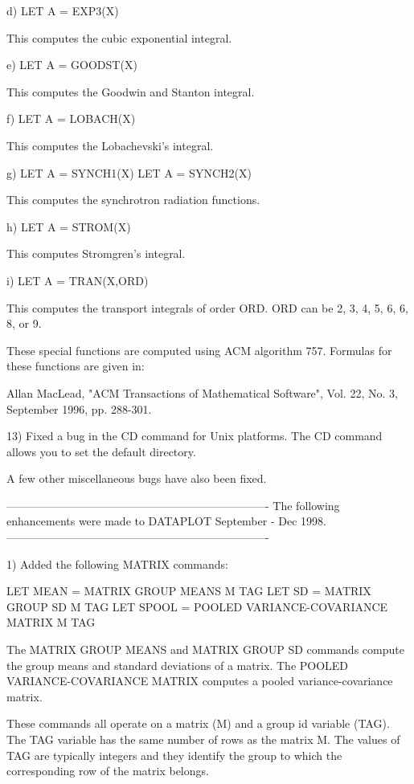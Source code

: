 {    d) LET A = EXP3(X)
 
       This computes the cubic exponential integral.

    e) LET A = GOODST(X)
 
       This computes the Goodwin and Stanton integral.

    f) LET A = LOBACH(X)
 
       This computes the Lobachevski's integral.

    g) LET A = SYNCH1(X)
       LET A = SYNCH2(X)
 
       This computes the synchrotron radiation functions.

    h) LET A = STROM(X)
 
       This computes Stromgren's integral.

    i) LET A = TRAN(X,ORD)
 
       This computes the transport integrals of order ORD.
       ORD can be 2, 3, 4, 5, 6, 6, 8, or 9.

    These special functions are computed using ACM algorithm 757.
    Formulas for these functions are given in:

        Allan MacLead, "ACM Transactions of Mathematical Software",
        Vol. 22, No. 3, September 1996, pp. 288-301.

13) Fixed a bug in the CD command for Unix platforms.  The CD command
    allows you to set the default directory.

    A few other miscellaneous bugs have also been fixed.

----------------------------------------------------------------------
The following enhancements were made to DATAPLOT September - Dec 1998.
----------------------------------------------------------------------

 1) Added the following MATRIX commands:

       LET MEAN = MATRIX GROUP MEANS M TAG
       LET SD   = MATRIX GROUP SD    M TAG
       LET SPOOL = POOLED VARIANCE-COVARIANCE MATRIX M TAG

    The MATRIX GROUP MEANS and MATRIX GROUP SD commands compute
    the group means and standard deviations of a matrix.
    The POOLED VARIANCE-COVARIANCE MATRIX computes a pooled
    variance-covariance matrix.

    These commands all operate on a matrix (M) and a group
    id variable (TAG).  The TAG variable has the same number of
    rows as the matrix M.  The values of TAG are typically integers
    and they identify the group to which the corresponding row
    of the matrix belongs.

}
